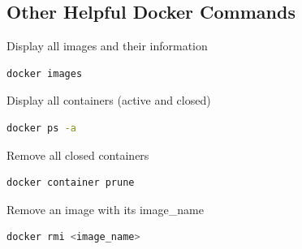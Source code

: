 \documentclass[a4paper,12pt]{article}
\begin{document}
\subsection{Other Helpful Docker Commands}


\hspace{0.5cm}
Display all images and their information
\begin{lstlisting}[language=bash, basicstyle=\ttfamily\footnotesize, frame=single, breaklines=true]
docker images
\end{lstlisting}

Display all containers (active and closed)
\begin{lstlisting}[language=bash, basicstyle=\ttfamily\footnotesize, frame=single, breaklines=true]
docker ps -a
\end{lstlisting}

Remove all closed containers
\begin{lstlisting}[language=bash, basicstyle=\ttfamily\footnotesize, frame=single, breaklines=true]
docker container prune
\end{lstlisting}

Remove an image with its image\_name
\begin{lstlisting}[language=bash, basicstyle=\ttfamily\footnotesize, frame=single, breaklines=true]
docker rmi <image_name>
\end{lstlisting}
\end{document}
